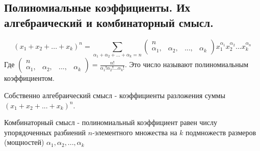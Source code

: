 \subsection{Полиномиальные коэффициенты. Их алгебраический и комбинаторный смысл.}
$$(x_1 + x_2 + ... + x_k)^n = \sum_{\alpha_1+\alpha_2+...+\alpha_k=n}\begin{pmatrix}n\\\alpha_1,&\alpha_2,&...,&\alpha_k\end{pmatrix}x_1^{\alpha_1}x_2^{\alpha_2}...x_k^{\alpha_n}$$
Где $\begin{pmatrix}n\\\alpha_1,&\alpha_2,&...,&\alpha_k\end{pmatrix} = \frac{n!}{\alpha_1!\alpha_2!...\alpha_k!}$. Это число называют полиномиальным коэффициентом. 

Собственно алгебраический смысл - коэффициенты разложения суммы $(x_1 + x_2 + ... + x_k)^n$.

Комбинаторный смысл - полиномиальный коэффициент равен числу упорядоченных разбиений $n$-элементного множества на $k$ подмножеств размеров (мощностей) $\alpha_1, \alpha_2,...,\alpha_k$